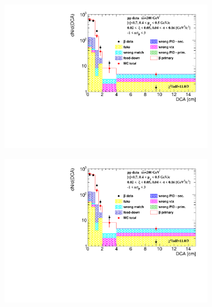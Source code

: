 \begin{figure}[htpb]
	\centering
	\begin{subfigure}{.47\textwidth}
		\includegraphics[width=\linewidth, page=1]{chapters/chrgSTAR/img/DCAproton/background_p_bar_0.pdf}
	\end{subfigure}
	\begin{subfigure}{.47\textwidth}
		\includegraphics[width=\linewidth, page=2]{chapters/chrgSTAR/img/DCAproton/background_p_bar_0.pdf}
	\end{subfigure}
	\begin{subfigure}{.47\textwidth}

\end{subfigure}
\end{figure}

